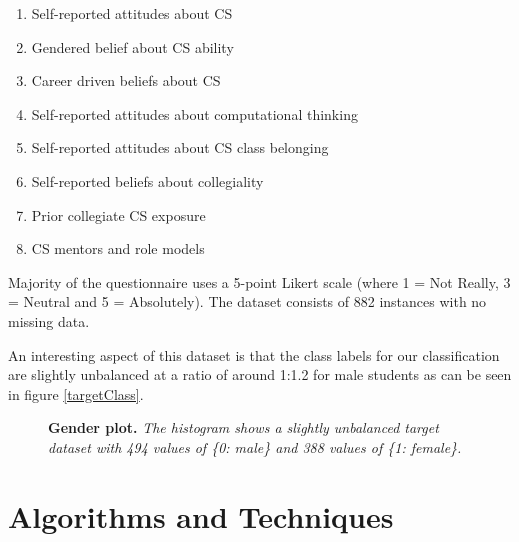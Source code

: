 \documentclass[twoside,openright,titlepage,numbers=noenddot,headinclude,%
               footinclude=true,cleardoublepage=empty,abstractoff,BCOR=5mm,%
               paper=a4,fontsize=11pt,ngerman,american]{scrreprt}
\numberwithin{theorem}{chapter}
\numberwithin{definition}{chapter}
\numberwithin{algorithm}{chapter}
\numberwithin{figure}{chapter}
\numberwithin{table}{chapter}
\numberwithin{equation}{chapter}
\begin{document}
\begin{enumerate}%
\item Self-reported attitudes about CS
\item Gendered belief about CS ability
\item Career driven beliefs about CS
\item Self-reported attitudes about computational thinking
\item Self-reported attitudes about CS class belonging
\item Self-reported beliefs about collegiality
\item Prior collegiate CS exposure
\item CS mentors and role models
\end{enumerate}
Majority of the questionnaire uses a 5-point Likert scale (where 1 = Not Really, 3 = Neutral and 5 = Absolutely). The dataset consists of 882 instances with no missing data.


An interesting aspect of this dataset is that the class labels for our classification are slightly unbalanced at a ratio of around 1:1.2 for male students as can be seen in figure \ref{targetClass}. 

\begin{figure}[!hbtp]
\centering
    
    \caption{\textbf{Gender plot. }\textit{The histogram shows a slightly unbalanced target dataset with 494 values of \{0: male\} and 388 values of \{1: female\}.}}
\end{figure}



\section*{Algorithms and Techniques}
\end{document}
